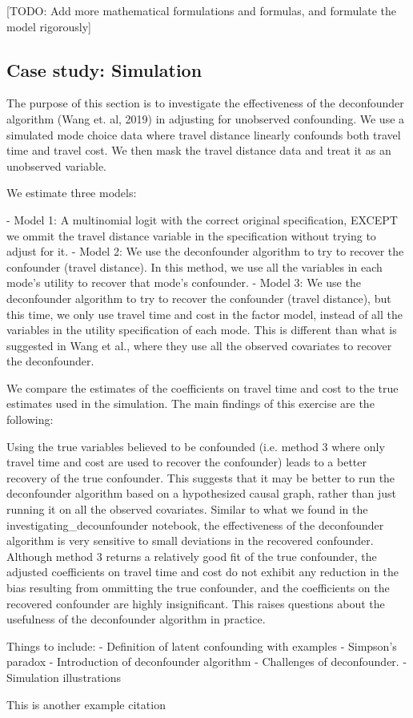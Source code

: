 [TODO: Add more mathematical formulations and formulas, and formulate the model rigorously]

\subsection{Case study: Simulation}

The purpose of this section is to investigate the effectiveness of the deconfounder algorithm (Wang et. al, 2019) in adjusting for unobserved confounding. We use a simulated mode choice data where travel distance linearly confounds both travel time and travel cost. We then mask the travel distance data and treat it as an unobserved variable. 

We estimate three models:

	- Model 1: A multinomial logit with the correct original specification, EXCEPT we ommit the travel distance variable in the specification without trying to adjust for it.
	- Model 2: We use the deconfounder algorithm to try to recover the confounder (travel distance). In this method, we use all the variables in each mode's utility to recover that mode's confounder.
	- Model 3: We use the deconfounder algorithm to try to recover the confounder (travel distance), but this time, we only use travel time and cost in the factor model, instead of all the variables in the utility specification of each mode. This is different than what is suggested in Wang et al., where they use all the observed covariates to recover the deconfounder. 

We compare the estimates of the coefficients on travel time and cost to the true estimates used in the simulation. The main findings of this exercise are the following:

Using the true variables believed to be confounded (i.e. method 3 where only travel time and cost are used to recover the confounder) leads to a better recovery of the true confounder. This suggests that it may be better to run the deconfounder algorithm based on a hypothesized causal graph, rather than just running it on all the observed covariates.
Similar to what we found in the investigating_decounfounder notebook, the effectiveness of the deconfounder algorithm is very sensitive to small deviations in the recovered confounder. Although method 3 returns a relatively good fit of the true confounder, the adjusted coefficients on travel time and cost do not exhibit any reduction in the bias resulting from ommitting the true confounder, and the coefficients on the recovered confounder are highly insignificant. This raises questions about the usefulness of the deconfounder algorithm in practice.




Things to include:
- Definition of latent confounding with examples
- Simpson's paradox
- Introduction of deconfounder algorithm
- Challenges of deconfounder. 
- Simulation illustrations



\blindtext[2]

This is another example citation \cite{wang_2019_blessings}
